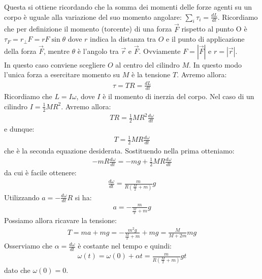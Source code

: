 \documentclass[12pt,a4paper]{book}
\begin{document}
Questa si ottiene ricordando che la somma dei momenti delle forze agenti su un corpo è uguale alla variazione del suo momento angolare:
$\sum_i \tau_i =\frac{dL}{dt}$. Ricordiamo che per definizione il momento (torcente) di una forza $\vec{F}$ rispetto al punto O è $\tau_F=r_{\perp}F=rF\sin \theta$ dove $r$ indica la distanza tra $O$ e il punto di applicazione della forza $\vec{F}$, mentre $\theta$ è l'angolo tra $\vec{r}$ e $\vec{F}$. Ovviamente $F=|\vec{F}|$ e $r=|\vec{r}|$.\\


In questo caso conviene scegliere $O$ al centro del cilindro $M$. In questo modo l'unica forza a esercitare momento su $M$ è la tensione $T$. Avremo allora:
\begin{gather*}
\tau=T R =\frac{dL}{dt}
\end{gather*}
Ricordiamo che $L=I \omega$, dove $I$ è il momento di inerzia del corpo. Nel caso di un cilindro $I=\frac{1}{2}MR^2$. Avremo allora:
\begin{gather*}
T R = \frac{1}{2}MR^2 \frac{d\omega}{dt} 
\end{gather*}
e dunque:
\begin{gather*}
T= \frac{1}{2}MR \frac{d\omega}{dt} 
\end{gather*}
che è la seconda equazione desiderata. Sostituendo nella prima otteniamo:
\begin{gather*}
-mR \frac{d\omega}{dt} =-mg + \frac{1}{2}MR \frac{d\omega}{dt}
\end{gather*}
da cui è facile ottenere:
\begin{gather*}
\frac{d\omega}{dt} = \frac{m}{R(\frac{M}{2}+m)} g
\end{gather*}
Utilizzando $a=-\frac{d\omega}{dt}  R$ si ha:
\begin{gather*}
a =- \frac{m}{\frac{M}{2}+m} g
\end{gather*}
Possiamo allora ricavare la tensione:
\begin{gather*}
T=ma+mg=-\frac{m^2 g}{\frac{M}{2}+m}   + mg= \frac{M}{M+2m} mg
\end{gather*}
Osserviamo che $\alpha=\frac{d\omega}{dt}$ è costante nel tempo e quindi:
\begin{gather*}
\omega(t)=\omega(0)+\alpha t=\frac{m}{R(\frac{M}{2}+m)} g t
\end{gather*}
dato che $\omega(0)=0$. \\
\end{document}
